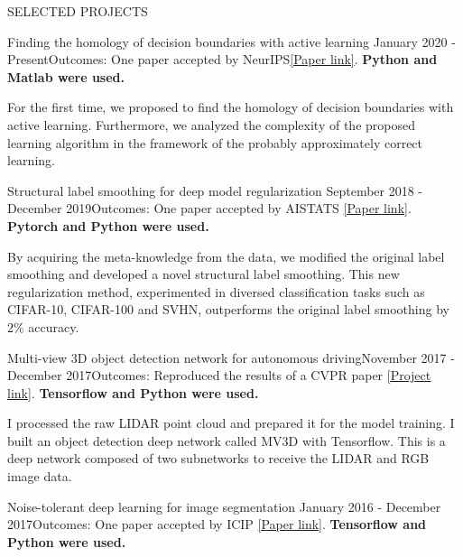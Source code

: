 \documentclass{resume} %
\begin{document}
\begin{rSection}{SELECTED PROJECTS}
\begin{rSubsection}{Finding the homology of decision boundaries with active learning} {January 2020 - Present}{Outcomes: One paper accepted by NeurIPS\href{https://arxiv.org/pdf/2011.09645.pdf}{[Paper link]}. \textbf{Python and Matlab were used.}}{}
\item For the first time, we proposed to find the homology of decision boundaries with active learning. Furthermore, we analyzed the complexity of the proposed learning algorithm in the framework of the probably approximately correct learning.
\end{rSubsection}  
\vspace{-0.1cm}
\begin{rSubsection}{Structural label smoothing for  deep model regularization} {September 2018 - December 2019}{Outcomes: One paper accepted by AISTATS \href{http://proceedings.mlr.press/v108/li20e/li20e.pdf}{[Paper link]}. \textbf{Pytorch and Python were used.}}{}
\item By acquiring the meta-knowledge from the data, we modified the original label smoothing and developed a novel structural label smoothing. This new regularization method, experimented in diversed classification tasks such as CIFAR-10, CIFAR-100 and SVHN, outperforms the original label smoothing by  2\% accuracy.
\end{rSubsection}  
\begin{rSubsection}{Multi-view 3D object detection network for autonomous driving}{November 2017 - December 2017}{Outcomes: Reproduced the results of a CVPR paper \href{https://github.com/wayne0908/Multi-View-3D-Object-Detection-Network-for-Autonomous-Driving}{[Project link]}. \textbf{Tensorflow and Python were used.}}{} 
\item I processed the raw LIDAR point cloud and prepared it for the model training. I built an object detection deep network called MV3D with Tensorflow. This is a deep network composed of two subnetworks to receive the LIDAR and RGB image data. \end{rSubsection}
\vspace{-0.1cm}
\begin{rSubsection}{Noise-tolerant deep learning for image segmentation} {January 2016 - December 2017}{Outcomes: One paper accepted by ICIP \href{https://ieeexplore.ieee.org/stamp/stamp.jsp?tp=&arnumber=8296848}{[Paper link]}. \textbf{Tensorflow and Python were used.}}{}

\end{rSubsection}
\end{rSection}
\end{document}
